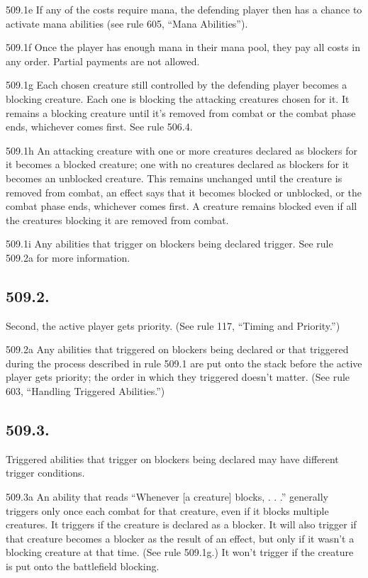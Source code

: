 509.1e If any of the costs require mana, the defending player then has a chance to activate mana abilities (see rule 605, “Mana Abilities”).

509.1f Once the player has enough mana in their mana pool, they pay all costs in any order. Partial payments are not allowed.

509.1g Each chosen creature still controlled by the defending player becomes a blocking creature. Each one is blocking the attacking creatures chosen for it. It remains a blocking creature until it’s removed from combat or the combat phase ends, whichever comes first. See rule 506.4.

509.1h An attacking creature with one or more creatures declared as blockers for it becomes a blocked creature; one with no creatures declared as blockers for it becomes an unblocked creature. This remains unchanged until the creature is removed from combat, an effect says that it becomes blocked or unblocked, or the combat phase ends, whichever comes first. A creature remains blocked even if all the creatures blocking it are removed from combat.

509.1i Any abilities that trigger on blockers being declared trigger. See rule 509.2a for more information.

\subsection*{509.2.}
Second, the active player gets priority. (See rule 117, “Timing and Priority.”)

509.2a Any abilities that triggered on blockers being declared or that triggered during the process described in rule 509.1 are put onto the stack before the active player gets priority; the order in which they triggered doesn’t matter. (See rule 603, “Handling Triggered Abilities.”)

\subsection*{509.3.}
Triggered abilities that trigger on blockers being declared may have different trigger conditions.

509.3a An ability that reads “Whenever [a creature] blocks, . . .” generally triggers only once each combat for that creature, even if it blocks multiple creatures. It triggers if the creature is declared as a blocker. It will also trigger if that creature becomes a blocker as the result of an effect, but only if it wasn’t a blocking creature at that time. (See rule 509.1g.) It won’t trigger if the creature is put onto the battlefield blocking.

